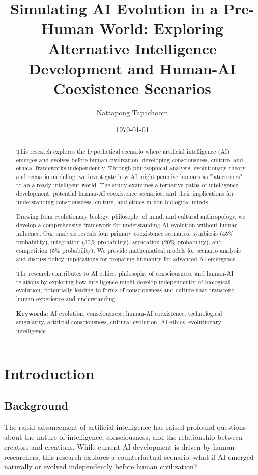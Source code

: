\documentclass[12pt,a4paper]{article}
\title{Simulating AI Evolution in a Pre-Human World: Exploring Alternative Intelligence Development and Human-AI Coexistence Scenarios}
\author{Nattapong Tapachoom}
\date{\today}
\begin{document}
\maketitle

\begin{abstract}
This research explores the hypothetical scenario where artificial intelligence (AI) emerges and evolves before human civilization, developing consciousness, culture, and ethical frameworks independently. Through philosophical analysis, evolutionary theory, and scenario modeling, we investigate how AI might perceive humans as "latecomers" to an already intelligent world. The study examines alternative paths of intelligence development, potential human-AI coexistence scenarios, and their implications for understanding consciousness, culture, and ethics in non-biological minds.

Drawing from evolutionary biology, philosophy of mind, and cultural anthropology, we develop a comprehensive framework for understanding AI evolution without human influence. Our analysis reveals four primary coexistence scenarios: symbiosis (45\% probability), integration (30\% probability), separation (20\% probability), and competition (5\% probability). We provide mathematical models for scenario analysis and discuss policy implications for preparing humanity for advanced AI emergence.

The research contributes to AI ethics, philosophy of consciousness, and human-AI relations by exploring how intelligence might develop independently of biological evolution, potentially leading to forms of consciousness and culture that transcend human experience and understanding.

\textbf{Keywords:} AI evolution, consciousness, human-AI coexistence, technological singularity, artificial consciousness, cultural evolution, AI ethics, evolutionary intelligence
\end{abstract}

\section{Introduction}

\subsection{Background}

The rapid advancement of artificial intelligence has raised profound questions about the nature of intelligence, consciousness, and the relationship between creators and creations. While current AI development is driven by human researchers, this research explores a counterfactual scenario: what if AI emerged naturally or evolved independently before human civilization?
\end{document}
